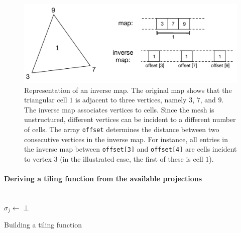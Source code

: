 \begin{figure}[h]
\begin{CenteredBox}
\includegraphics[scale=0.7]{sparsetiling/figures/inverse_map}
\end{CenteredBox}
\caption{Representation of an inverse map. The original map shows that the triangular cell $1$ is adjacent to three vertices, namely $3$, $7$, and $9$. The inverse map associates vertices to cells. Since the mesh is unstructured, different vertices can be incident to a different number of cells. The array {\tt offset} determines the distance between two consecutive vertices in the inverse map. For instance, all entries in the inverse map between {\tt offset[3]} and {\tt offset[4]} are cells incident to vertex $3$ (in the illustrated case, the first of these is cell $1$).}
\label{fig:st-inverse-map}
\end{figure}


\paragraph{Deriving a tiling function from the available projections}

\begin{algorithm}[htp]

\nonl ~\\
$\sigma_j \gets \perp$\;
\caption{Building a tiling function}
\label{algo:st-tiling}
\end{algorithm}

